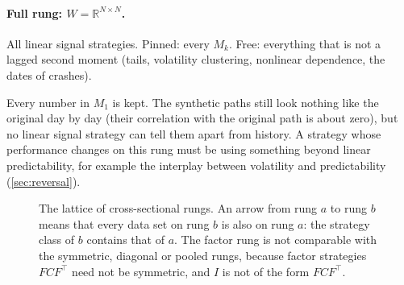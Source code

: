 \documentclass[11pt]{article}
\theoremstyle{definition}
\theoremstyle{remark}
\newcommand{\R}{\mathbb{R}}
\newcommand{\tr}{\operatorname{tr}}
\newcommand{\diag}{\operatorname{diag}}
\begin{document}
\paragraph{Full rung: $W=\R^{N\times N}$.} All linear signal strategies. Pinned: every $M_k$. Free: everything that is not a lagged second
moment (tails, volatility clustering, nonlinear dependence, the dates of crashes).
\begin{plainwords}[: full]
Every number in $M_1$ is kept. The synthetic paths still look nothing like the original day by day (their correlation with the original path is about
zero), but no linear signal strategy can tell them apart from history. A strategy whose performance changes on this rung must be using something
beyond linear predictability, for example the interplay between volatility and predictability (\cref{sec:reversal}).
\end{plainwords}

\begin{figure}[htbp]
\centering
{}
\caption{The lattice of cross-sectional rungs. An arrow from rung $a$ to rung $b$ means that every data set on rung $b$ is also on rung $a$: the strategy
class of $b$ contains that of $a$. The factor rung is not comparable with the symmetric, diagonal or pooled rungs, because factor strategies $FCF^\top$
need not be symmetric, and $I$ is not of the form $FCF^\top$.}
\label{fig:lattice}
\end{figure}
\end{document}
